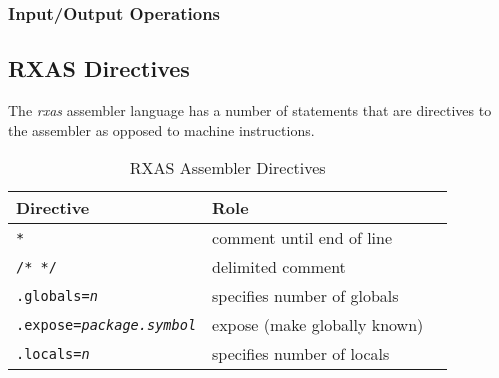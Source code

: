 \subsubsection{Input/Output Operations}

\subsection{RXAS Directives}

The \emph{rxas} assembler language has a number of statements that are
directives to the assembler as opposed to machine instructions.

\begin{table}
  \centering
  \begin{DIFnomarkup}
  \begin{threeparttable}
    \begin{tabularx}{\textwidth}{lXl}
      \toprule
      Directive & Role &  \\
      \midrule
      \texttt{*} & comment until end of line & \\
      \texttt{/* */} & delimited comment & \\
      \texttt{.globals=\emph{n}} & specifies number of globals & \\
      \texttt{.expose=\emph{package.symbol}} & expose (make globally known) & \\
      \texttt{.locals=\emph{n}} &  specifies number of locals & \\
      \bottomrule
    \end{tabularx}
    \medskip
  \end{threeparttable}
  \end{DIFnomarkup}
  \caption{RXAS Assembler Directives}
  \label{tab:rxasdirectives}
\end{table}
